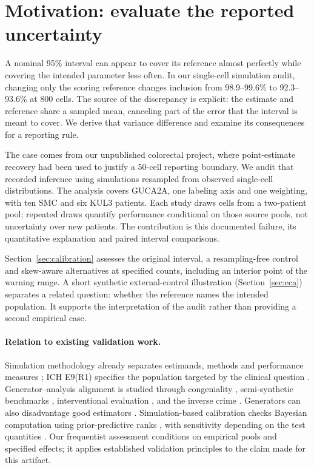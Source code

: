 \section{Motivation: evaluate the reported uncertainty}
\label{sec:intro}

A nominal 95\% interval can appear to cover its reference almost perfectly
while covering the intended parameter less often. In our single-cell
simulation audit, changing only the scoring reference changes inclusion
from 98.9--99.6\% to 92.3--93.6\% at 800 cells. The source of the discrepancy
is explicit: the estimate and reference share a sampled mean, canceling
part of the error that the interval is meant to cover. We derive that
variance difference and examine its consequences for a reporting rule.

The case comes from our unpublished colorectal project, where point-estimate
recovery had been used to justify a 50-cell reporting boundary. We audit that
recorded inference using simulations resampled from observed single-cell
distributions. The analysis covers GUCA2A, one labeling axis and one weighting,
with ten SMC and six KUL3 patients. Each study draws cells from a two-patient
pool; repeated draws quantify performance conditional on those source pools,
not uncertainty over new patients. The contribution is this documented
failure, its quantitative explanation and paired interval comparisons.

Section~\ref{sec:calibration} assesses the original interval, a resampling-free
control and skew-aware alternatives at specified counts, including an
interior point of the warning range. A short synthetic external-control
illustration (Section~\ref{sec:eca}) separates a related question: whether
the reference names the intended population. It supports the interpretation
of the audit rather than providing a second empirical case.

\paragraph{Relation to existing validation work.}
Simulation methodology already separates estimands, methods and performance
measures \citep{burton2006,morris2019}; ICH E9(R1) specifies the population
targeted by the clinical question \citep{ich2019}. Generator--analysis
alignment is studied through congeniality \citep{meng1994}, semi-synthetic
benchmarks \citep{franklin2014,curth2021}, interventional evaluation
\citep{gentzel2019}, and the inverse crime \citep{wirgin2004,kaipio2007}.
Generators can also disadvantage good estimators \citep{shaw2026}.
Simulation-based calibration checks Bayesian computation using
prior-predictive ranks \citep{talts2018}, with sensitivity depending on the
test quantities \citep{modrak2025}. Our frequentist assessment conditions
on empirical pools and specified effects; it applies established validation
principles to the claim made for this artifact.

